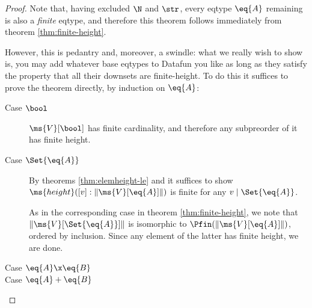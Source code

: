 \documentclass{article}
\newcommand{\widevec}[1]{\overrightarrow{#1}}
\newcommand{\eqposet}[1]{\ms{Eq}(#1)}
\renewcommand{\eqposet}[1]{\|{#1}\|}
\newcommand{\eqclass}[1]{[#1]}
\newcommand{\height}{\ms{height}}
\newcommand{\elemheight}[2]{\height(#2 : #1)}
\newcommand{\down}[2]{\mathop{\downarrow}(#2 : #1)}
\newcommand{\lr}[2]{#2\mathrel{|}#1}
\newcommand{\Val}[1]{\ms{V}[#1]}
\begin{document}
\begin{proof}
  Note that, having excluded $\N$ and $\str$, every eqtype $\eq{A}$ remaining is
  also a \emph{finite} eqtype, and therefore this theorem follows immediately
  from theorem \ref{thm:finite-height}.

  However, this is pedantry and, moreover, a swindle: what we really wish to
  show is, you may add whatever base eqtypes to Datafun you like as long as they
  satisfy the property that all their downsets are finite-height. To do this it
  suffices to prove the theorem directly, by induction on $\eq{A}$:
  \begin{description}
  \item[Case $\bool$] $\Val{\bool}$ has finite cardinality, and therefore any
    subpreorder of it has finite height.


  \item[Case $\Set{\eq{A}}$] By theorems \ref{thm:elemheight-le} and it suffices
    to show $\elemheight{\eqposet{\Val{\eq{A}}}}{\eqclass{v}}$ is finite for any
    $\lr{\Set{\eq{A}}}{v}$.

    As in the corresponding case in theorem \ref{thm:finite-height}, we note
    that $\eqposet{\Val{\Set{\eq{A}}}}$ is isomorphic to
    $\Pfin(\eqposet{\Val{\eq{A}}})$, ordered by inclusion. Since any element of
    the latter has finite height, we are done.



  \item[Case $\eq{A} \x \eq{B}$] \TODO
  \item[Case $\eq{A} + \eq{B}$] \TODO
  \end{description}
\end{proof}
\end{document}
